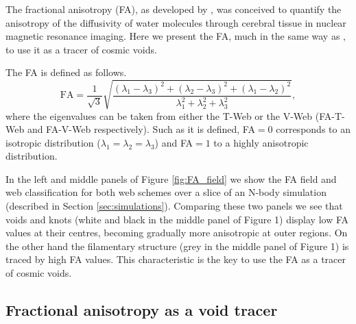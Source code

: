 \documentclass[a4,useAMS,usenatbib,usegraphicx]{mn2e}
\newcommand{\eq}[2]{\begin{equation} \label{eq:#1} #2 \end{equation}}
\begin{document}
The fractional anisotropy (FA), as developed by \citet{Basser95}, was 
conceived to quantify the anisotropy of the diffusivity of water
molecules through cerebral tissue in nuclear magnetic resonance imaging. 
Here we present the FA, much in the same way as \citet{Libeskind13},
to use it as a tracer of cosmic voids.


The FA is defined as follows.
\eq{fractional_anisotropy}
{{\mathrm{FA}} = \frac{1}{\sqrt{3}}\sqrt{ \frac{ (\lambda_1 - \lambda_3)^2 + 
(\lambda_2 - \lambda_3)^2 + (\lambda_1 - \lambda_2)^2}{ \lambda_1^2 + 
\lambda_2^2 + \lambda_3^2} },}
where the eigenvalues can be taken from either the T-Web or the V-Web 
(FA-T-Web and FA-V-Web respectively). Such as it is defined, FA$=0$ 
corresponds to an isotropic distribution ($\lambda_1=\lambda_2=\lambda_3$) 
and FA$=1$ to a highly anisotropic distribution.


In the left and middle panels of Figure \ref{fig:FA_field} we show the
FA field and web classification for both  web schemes over a slice of
an N-body simulation (described in Section \ref{sec:simulations}). 
Comparing these two panels we see that voids and knots (white
and black in the middle panel of Figure 1) display low FA values at
their  centres, becoming gradually more anisotropic at outer regions.  
On the other hand the filamentary structure (grey in the middle panel
of Figure 1) is traced by high FA values.  
This characteristic is the  key to use the FA as a tracer of cosmic
voids.  


\subsection{Fractional anisotropy as a void tracer}
\label{subsec:web_voids}
\end{document}
